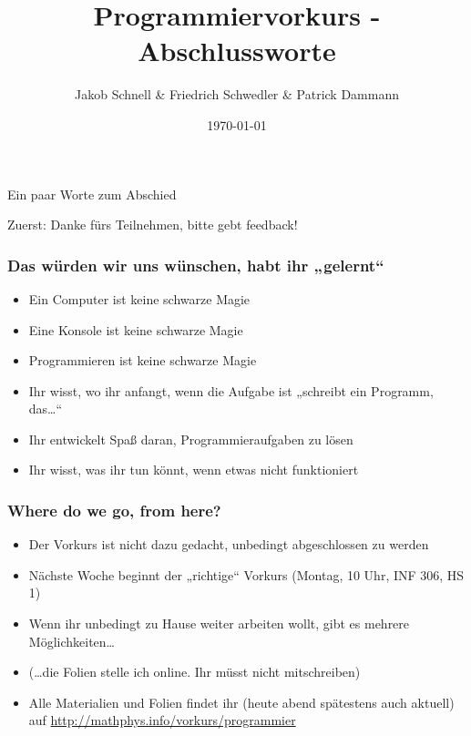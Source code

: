 \documentclass{beamer}
\begin{document}
\title{Programmiervorkurs - Abschlussworte}
\author{Jakob Schnell \& Friedrich Schwedler \& Patrick Dammann}
\date{\today}

\begin{frame}
\titlepage
\end{frame}

\begin{frame}
    \begin{center}
        \Huge Ein paar Worte zum Abschied
    \end{center}
    \pause\begin{center}
        \Huge Zuerst: Danke fürs Teilnehmen, bitte gebt feedback!
    \end{center}
\end{frame}

\begin{frame}
    \frametitle{Das würden wir uns wünschen, habt ihr „gelernt“}
    \begin{itemize}
        \pause\item Ein Computer ist keine schwarze Magie
        \pause\item Eine Konsole ist keine schwarze Magie
        \pause\item Programmieren ist keine schwarze Magie
        \pause\item Ihr wisst, wo ihr anfangt, wenn die Aufgabe ist „schreibt
            ein Programm, das\dots“
        \pause\item Ihr entwickelt Spaß daran, Programmieraufgaben zu lösen
        \pause\item Ihr wisst, was ihr tun könnt, wenn etwas nicht funktioniert
    \end{itemize}
\end{frame}

\begin{frame}
    \frametitle{Where do we go, from here?}

    \begin{itemize}
        \pause\item Der Vorkurs ist nicht dazu gedacht, unbedingt abgeschlossen
            zu werden
        \pause\item Nächste Woche beginnt der „richtige“ Vorkurs (Montag, 10
            Uhr, INF 306, HS 1)
        \pause\item Wenn ihr unbedingt zu Hause weiter arbeiten wollt, gibt es
            mehrere Möglichkeiten\dots
        \pause\item (\dots die Folien stelle ich online. Ihr müsst nicht
            mitschreiben)
        \pause\item Alle Materialien und Folien findet ihr (heute abend
            spätestens auch aktuell) auf \url{http://mathphys.info/vorkurs/programmier}
    \end{itemize}
\end{frame}
\end{document}
